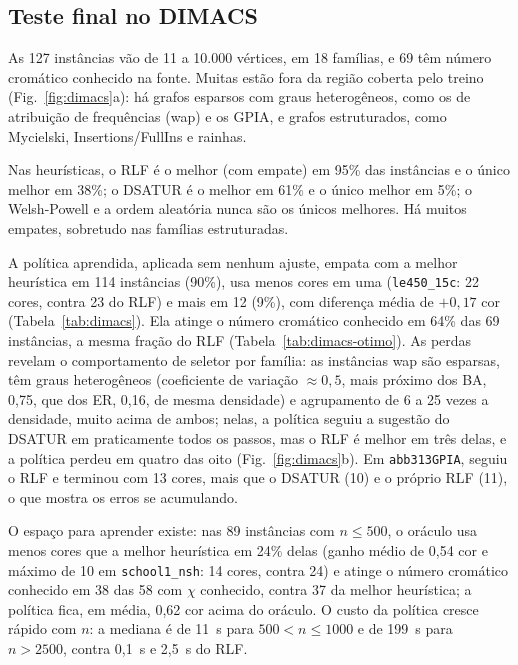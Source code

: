 \documentclass[conference,a4paper]{IEEEtran}
\newcommand{\tabela}[1]{}
\begin{document}
\subsection{Teste final no DIMACS}\label{sec:res-dimacs}
As 127 instâncias vão de 11 a 10.000 vértices, em 18 famílias, e 69 têm número cromático
conhecido na fonte. Muitas estão fora da região coberta pelo treino (Fig.~\ref{fig:dimacs}a):
há grafos esparsos com graus heterogêneos, como os de atribuição de frequências (wap) e os
GPIA, e grafos estruturados, como Mycielski, Insertions/FullIns e rainhas.

Nas heurísticas, o RLF é o melhor (com empate) em 95\% das instâncias e o único melhor em
38\%; o DSATUR é o melhor em 61\% e o único melhor em 5\%; o Welsh-Powell e a ordem aleatória
nunca são os únicos melhores. Há muitos empates, sobretudo nas famílias estruturadas.

A política aprendida, aplicada sem nenhum ajuste, empata com a melhor heurística em 114
instâncias (90\%), usa menos cores em uma (\texttt{le450\_15c}: 22 cores, contra 23 do RLF) e
mais em 12 (9\%), com diferença média de $+0{,}17$ cor (Tabela~\ref{tab:dimacs}). Ela atinge o
número cromático conhecido em 64\% das 69 instâncias, a mesma fração do RLF
(Tabela~\ref{tab:dimacs-otimo}). As perdas revelam o comportamento de seletor por família:
as instâncias wap são esparsas, têm graus heterogêneos (coeficiente de variação $\approx0{,}5$,
mais próximo dos BA, 0,75, que dos ER, 0,16, de mesma densidade) e agrupamento de 6 a 25 vezes
a densidade, muito acima de ambos; nelas, a política seguiu a sugestão do DSATUR em
praticamente todos os passos, mas o RLF é melhor em três delas, e a política perdeu em quatro
das oito (Fig.~\ref{fig:dimacs}b). Em \texttt{abb313GPIA}, seguiu o
RLF e terminou com 13 cores, mais que o DSATUR (10) e o próprio RLF (11), o que mostra os erros
se acumulando.

O espaço para aprender existe: nas 89 instâncias com $n\le500$, o oráculo usa menos cores que a
melhor heurística em 24\% delas (ganho médio de 0,54 cor e máximo de 10 em
\texttt{school1\_nsh}: 14 cores, contra 24) e atinge o número cromático conhecido em 38 das 58
com $\chi$ conhecido, contra 37 da melhor heurística; a política fica, em média, 0,62 cor acima
do oráculo. O custo da política cresce rápido com $n$: a mediana é de 11~s para
$500<n\le1000$ e de 199~s para $n>2500$, contra 0,1~s e 2,5~s do RLF.

\begin{table}[t]
\centering
\caption{DIMACS: política aprendida comparada a cada referência (fração das instâncias em
que usa menos, o mesmo número ou mais cores; $\bar{\Delta}$ em cores)}\label{tab:dimacs}
\footnotesize
\tabela{dimacs_resumo}
\end{table}
\end{document}
